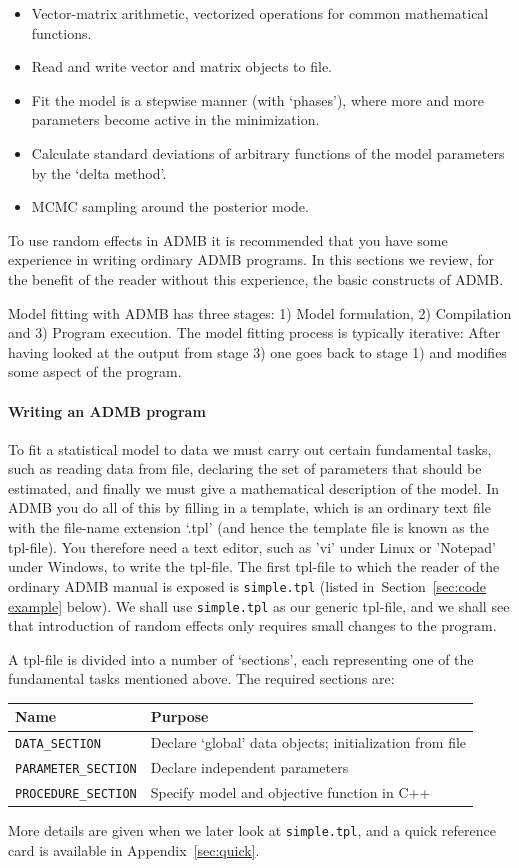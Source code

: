 \documentclass[12pt,letter,reqno]{book}
\begin{document}
\begin{itemize}
\item Vector-matrix arithmetic, vectorized operations for common mathematical functions.
\item Read and write vector and matrix objects to file.
\item Fit the model is a stepwise manner (with `phases'), where more and more parameters become active in the minimization.
\item Calculate standard deviations of arbitrary functions of the model parameters by the `delta method'.
\item MCMC sampling around the posterior mode.
\end{itemize}
To use random effects in ADMB it is recommended that you have some experience in writing ordinary ADMB programs.
In this sections we review, for the benefit of the reader without this experience, the basic constructs of ADMB.

Model fitting with ADMB has three stages: 1) Model formulation, 2) Compilation and 3) Program execution.
The model fitting process is typically iterative: After having looked at the output from stage 3) one goes back to
stage 1) and modifies some aspect of the program.

\paragraph{Writing an ADMB program}
To fit a statistical model to data we must carry out certain fundamental tasks, such as
reading data from file, declaring the set of parameters that should be estimated, and finally we must give a
mathematical description of the model. In ADMB you do all of this by filling in a template, which is an ordinary
text file with the file-name extension `.tpl' (and hence the template file is known as the tpl-file). You
therefore need a text editor, such as 'vi' under Linux or 'Notepad' under Windows, to write the tpl-file. The
first tpl-file to which the reader of the ordinary ADMB manual is exposed is \texttt{simple.tpl} (listed
in~Section~\ref{sec:code example} below). We shall use \texttt{simple.tpl} as our generic tpl-file, and we shall
see that introduction of random effects only requires small changes to the program.

A tpl-file is divided into a number of `sections', each representing one of the fundamental tasks mentioned
above. The required sections are:
\begin{center}
\begin{tabular}{ll}
\textbf{Name} & \textbf{Purpose} \\ \hline
\texttt{DATA\_SECTION} & Declare `global' data objects; initialization from file \\
\texttt{PARAMETER\_SECTION} & Declare independent parameters \\
\texttt{PROCEDURE\_SECTION} & Specify model and objective function in C++
\end{tabular}
\end{center}
More details are given when we later look at \texttt{simple.tpl}, and a quick reference
card is available in Appendix~\ref{sec:quick}.
\end{document}
